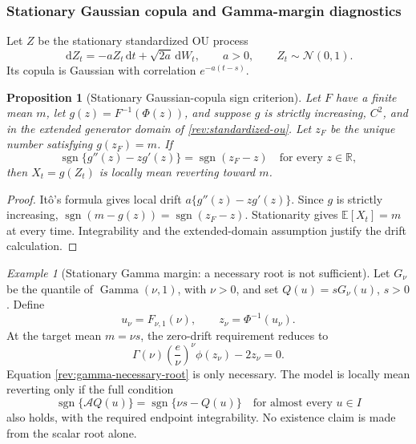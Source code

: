 \documentclass[11pt]{article}
\newtheorem{proposition}[definition]{Proposition}
\theoremstyle{remark}
\newtheorem{example}[definition]{Example}
\newcommand{\E}{\mathbb E}
\newcommand{\R}{\mathbb R}
\newcommand{\dd}{\,\mathrm d}
\newcommand{\sgn}{\operatorname{sgn}}
\newcommand{\Normal}{\mathcal N}
\newcommand{\Gam}{\operatorname{Gamma}}
\begin{document}
\subsubsection{Stationary Gaussian copula and Gamma-margin diagnostics}

Let $Z$ be the stationary standardized OU process
\begin{equation}
\dd Z_t=-aZ_t\dd t+\sqrt{2a}\dd W_t,\qquad a>0,\qquad Z_t\sim\Normal(0,1).
\label{rev:standardized-ou}
\end{equation}
Its copula is Gaussian with correlation $e^{-a(t-s)}$.

\begin{proposition}[Stationary Gaussian-copula sign criterion]
\label{rev:prop-stationary-gaussian}
Let $F$ have a finite mean $m$, let
$g(z)=F^{-1}(\Phi(z))$, and suppose $g$ is strictly increasing,
$C^2$, and in the extended generator domain of \eqref{rev:standardized-ou}.
Let $z_F$ be the unique number satisfying $g(z_F)=m$.  If
\begin{equation}
\sgn\{g''(z)-zg'(z)\}=\sgn(z_F-z)
\quad\text{for every }z\in\R,
\label{rev:stationary-gaussian-sign}
\end{equation}
then $X_t=g(Z_t)$ is locally mean reverting toward $m$.
\end{proposition}

\begin{proof}
It\^o's formula gives local drift
$a\{g''(z)-zg'(z)\}$.  Since $g$ is strictly increasing,
$\sgn(m-g(z))=\sgn(z_F-z)$.  Stationarity gives
$\E[X_t]=m$ at every time.  Integrability and the extended-domain assumption
justify the drift calculation.
\end{proof}

\begin{example}[Stationary Gamma margin: a necessary root is not sufficient]
\label{rev:ex-gamma-stationary}
Let $G_\nu$ be the quantile of $\Gam(\nu,1)$, with $\nu>0$, and set
$Q(u)=sG_\nu(u)$, $s>0$.  Define
\begin{equation}
u_\nu=F_{\nu,1}(\nu),\qquad z_\nu=\Phi^{-1}(u_\nu).
\label{rev:gamma-mean-quantile}
\end{equation}
At the target mean $m=\nu s$, the zero-drift requirement reduces to
\begin{equation}
\Gamma(\nu)\left(\frac e\nu\right)^\nu\phi(z_\nu)-2z_\nu=0.
\label{rev:gamma-necessary-root}
\end{equation}
Equation \eqref{rev:gamma-necessary-root} is only necessary.  The model is
locally mean reverting only if the full condition
\begin{equation}
\sgn\{\mathcal A Q(u)\}=\sgn\{\nu s-Q(u)\}
\quad\text{for almost every }u\in I
\label{rev:gamma-full-sign}
\end{equation}
also holds, with the required endpoint integrability.  No existence claim is
made from the scalar root alone.
\end{example}
\end{document}
